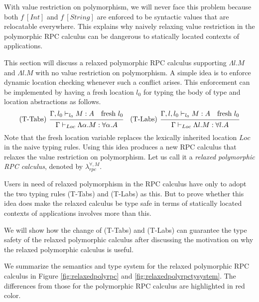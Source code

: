 \documentclass[a4paper]{article}
\theoremstyle{plain}
\theoremstyle{definition}
\newcommand{\polyrpcM}{$\lambda_{rpc}^{\forall,M}$\xspace}
\newcommand{\tyenv}{\Gamma}
\newcommand{\tyenvExtWith}[1]{\Gamma,#1}
\newcommand{\typing}[4]{#1\vdash_{#2} #3 : #4}
\newcommand{\Loc}{Loc}
\begin{document}
%
With value restriction on polymorphism, we will never face this
problem because both $f \ [Int]$ and $f \ [String]$ are enforced to be
syntactic values that are relocatable everywhere.
%
This explains why naively relaxing value restriction in the
polymorphic RPC calculus can be dangerous to statically located
contexts of applications.


%
This section will discuss a relaxed polymorphic RPC calculus
supporting $\Lambda l.M$ and $\Lambda l.M$ with no value restriction
on polymorphism.
%
A simple idea is to enforce dynamic location checking whenever such a
conflict arises.
%
This enforcement can be implemented by having a fresh location $l_0$
for typing the body of type and location abstractions as follows.
%
\[
    \begin{prooftree}
      \hypo{  \typing{\tyenv,l_0}{l_0}{M}{A} \ \ \ \mbox{fresh} \ l_0}
      \infer[left label=(T-Tabs)]1{ \typing{\tyenv}{\Loc}{\Lambda\alpha. M}{\forall\alpha. A}   }
    \end{prooftree}
    \ \ \
    \begin{prooftree}
      \hypo{ \typing{\tyenvExtWith{l},l_0}{l_0}{M}{A}  \ \ \ \mbox{fresh} \ l_0}
      \infer[left label=(T-Labs)]1{ \typing{\tyenv}{\Loc}{\Lambda l. M}{\forall l. A }}
    \end{prooftree}
\]
%
Note that the fresh location variable replaces the lexically inherited
location $\Loc$ in the naive typing rules.
%
Using this idea produces a new RPC calculus that relaxes the value
restriction on polymorphism.
%
Let us call it a {\it relaxed polymorphic RPC calculus}, denoted by \polyrpcM.

%
Users in need of relaxed polymorphism in the RPC calculus have only to
adopt the two typing rules (T-Tabs) and (T-Labs) as this.
%
But to prove whether this idea does make the relaxed calculus be type
safe in terms of statically located contexts of applications involves
more than this.

%
We will show how the change of (T-Tabs) and (T-Labs) can guarantee the
type safety of the relaxed polymorphic calculus after discussing the
motivation on why the relaxed polymorphic calculus is useful.

%
We summarize the semantics and type system for the relaxed polymorphic
RPC calculus in Figure \ref{fig:relaxedpolyrpc} and
\ref{fig:relaxedpolyrpctysystem}.
%
The differences from those for the polymorphic RPC calculus are
highlighted in red color.
\end{document}
